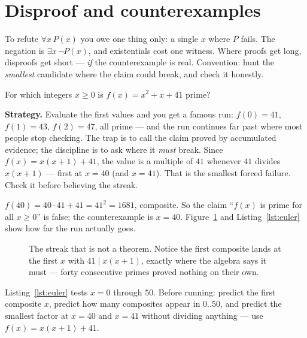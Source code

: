 \section{Disproof and counterexamples}\label{sec:disproof}

To refute $\forall x\,P(x)$ you owe one thing only: a single $x$ where $P$
fails. The negation is $\exists x\,\lnot P(x)$, and existentials cost one
witness. Where proofs get long, disproofs get short --- \emph{if} the
counterexample is real. Convention: hunt the \emph{smallest} candidate where the
claim could break, and check it honestly.

\begin{example}\label{ex:euler}
For which integers $x \ge 0$ is $f(x) = x^2 + x + 41$ prime?
\par\smallskip
\textbf{Strategy.} Evaluate the first values and you get a famous run: $f(0) =
41$, $f(1) = 43$, $f(2) = 47$, all prime --- and the run continues far past
where most people stop checking. The trap is to call the claim proved by
accumulated evidence; the discipline is to ask where it \emph{must} break. Since
$f(x) = x(x+1) + 41$, the value is a multiple of $41$ whenever $41$ divides
$x(x+1)$ --- first at $x = 40$ (and $x = 41$). That is the smallest forced
failure. Check it before believing the streak.
\par\smallskip
\begin{solution}
$f(40) = 40\cdot 41 + 41 = 41^2 = 1681$, composite. So the claim ``$f(x)$ is
prime for all $x \ge 0$'' is false; the counterexample is $x = 40$.
Figure~\ref{fig:euler} and Listing~\ref{lst:euler} show how far the run actually
goes.
\end{solution}
\end{example}

\begin{figure}[ht]\centering

\caption{The streak that is not a theorem. Notice the first composite lands at
the first $x$ with $41 \mid x(x+1)$, exactly where the algebra says it must ---
forty consecutive primes proved nothing on their own.}
\label{fig:euler}
\end{figure}

\begin{checkpoint}
Listing~\ref{lst:euler} tests $x = 0$ through $50$. Before running: predict the
first composite $x$, predict how many composites appear in $0..50$, and predict
the smallest factor at $x = 40$ and $x = 41$ without dividing anything ---
use $f(x) = x(x+1) + 41$.
\end{checkpoint}

